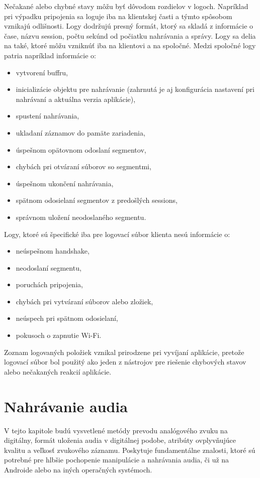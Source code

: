 Nečakané alebo chybné stavy môžu byť dôvodom rozdielov v logoch. Napríklad pri výpadku pripojenia sa loguje iba na klientskej časti a týmto spôsobom vznikajú odlišnosti. Logy dodržujú presný formát, ktorý sa skladá z informácie o čase, názvu session, počtu sekúnd od počiatku nahrávania a správy. Logy sa delia na také, ktoré môžu vzniknúť iba na klientovi a na spoločné.
Medzi spoločné logy patria napríklad informácie o:
\begin{itemize}
  \item{vytvorení buffru,}
  \item{inicializácie objektu pre nahrávanie (zahrnutá je aj konfigurácia nastavení pri nahrávaní a aktuálna verzia aplikácie),}
  \item{spustení nahrávania,}
  \item{ukladaní záznamov do pamäte zariadenia,}
  \item{úspešnom opätovnom odoslaní segmentov,}
  \item{chybách pri otváraní súborov so segmentmi,}
  \item{úspešnom ukončení nahrávania,}
  \item{spätnom odosielaní segmentov z predošlých sessions,}
  \item{správnom uložení neodoslaného segmentu.}
\end{itemize}
Logy, ktoré sú špecifické iba pre logovací súbor klienta nesú informácie o:
\begin{itemize}
  \item{neúspešnom handshake,}
  \item{neodoslaní segmentu,}
  \item{poruchách pripojenia,}
  \item{chybách pri vytváraní súborov alebo zložiek,}
  \item{neúspech pri spätnom odosielaní,}
  \item{pokusoch o zapnutie Wi-Fi.}
\end{itemize}

Zoznam logovaných položiek vznikal prirodzene pri vyvíjaní aplikácie, pretože logovací súbor bol použitý ako jeden z nástrojov pre riešenie chybových stavov alebo nečakaných reakcií aplikácie.


\chapter{Nahrávanie audia}
\label{nahravanie}

V tejto kapitole budú vysvetlené metódy prevodu analógového zvuku na digitálny, formát uloženia audia v digitálnej podobe, atribúty ovplyvňujúce kvalitu a veľkosť zvukového záznamu. Poskytuje fundamentálne znalosti, ktoré sú potrebné pre hlbšie pochopenie manipulácie a nahrávania audia, či už na Androide alebo na iných operačných systémoch.



